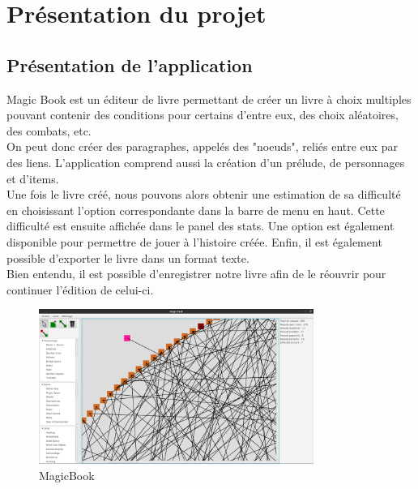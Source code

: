 \chapter{Présentation du projet}

	\section{Présentation de l'application}
        Magic Book est un éditeur de livre permettant de créer un livre à choix multiples pouvant contenir des conditions pour certains d'entre eux, des choix aléatoires, des combats, etc.\\
        On peut donc créer des paragraphes, appelés des "noeuds", reliés entre eux par des liens. L'application comprend aussi la création d'un prélude, de personnages et d'items.\\
        Une fois le livre créé, nous pouvons alors obtenir une estimation de sa difficulté en choisissant l'option correspondante dans la barre de menu en haut. Cette difficulté est ensuite affichée dans le panel des stats. Une option est également disponible pour permettre de jouer à l'histoire créée. Enfin, il est également possible d'exporter le livre dans un format texte.\\
        Bien entendu, il est possible d'enregistrer notre livre afin de le réouvrir pour continuer l'édition de celui-ci.\\

		\begin{figure}[H]
			\centering\includegraphics[width=0.80\textwidth]{img/MagicBook.png}
			\caption{MagicBook}
		\end{figure}
